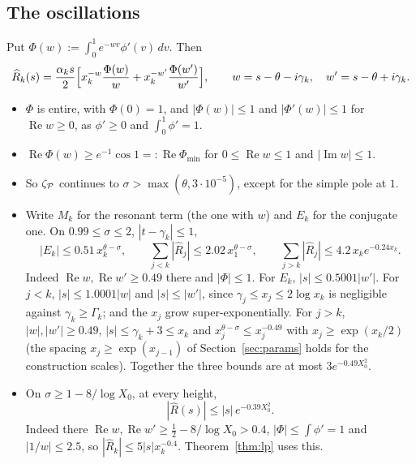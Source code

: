 \subsection{The oscillations}
Put $\Phi(w):=\int_0^1e^{-wv}\phi'(v)\,dv$. Then
\begin{equation}\label{eq:Rhat}
  \widehat R_k(s)=\frac{\alpha_ks}2\Bigl[x_k^{-w}\frac{\Phi(w)}w+x_k^{-w'}\frac{\Phi(w')}{w'}\Bigr],\qquad w=s-\theta-i\gamma_k,\quad
  w'=s-\theta+i\gamma_k.
\end{equation}
\begin{itemize}
\item $\Phi$ is entire, with $\Phi(0)=1$, and $|\Phi(w)|\le1$ and $|\Phi'(w)|\le1$ for $\operatorname{Re}w\ge0$, as $\phi'\ge0$ and
$\int_0^1\phi'=1$.
\item $\operatorname{Re}\Phi(w)\ge e^{-1}\cos1=:\operatorname{Re}\Phi_{\min}$ for $0\le\operatorname{Re}w\le1$ and $|\operatorname{Im}w|\le1$.
\item So $\zeta_{\mathcal{P}}$ continues to $\sigma>\max(\theta,3\cdot10^{-5})$, except for the simple pole at $1$.
\item Write $M_k$ for the resonant term (the one with $w$) and $E_k$ for the conjugate one. On $0.99\le\sigma\le2$, $|t-\gamma_k|\le1$,
\[
  |E_k|\le0.51\,x_k^{\theta-\sigma},\qquad\sum_{j<k}|\widehat R_j|\le2.02\,x_1^{\theta-\sigma},\qquad
  \sum_{j>k}|\widehat R_j|\le4.2\,x_ke^{-0.24x_k}.
\]
Indeed $\operatorname{Re}w,\operatorname{Re}w'\ge0.49$ there and $|\Phi|\le1$. For $E_k$, $|s|\le0.5001|w'|$. For $j<k$, $|s|\le1.0001|w|$
and $|s|\le|w'|$, since $\gamma_j\le x_j\le2\log x_k$ is negligible against $\gamma_k\ge\Gamma_k$; and the $x_j$ grow
super-exponentially. For $j>k$, $|w|,|w'|\ge0.49$, $|s|\le\gamma_k+3\le x_k$ and $x_j^{\theta-\sigma}\le x_j^{-0.49}$ with
$x_j\ge\exp(x_k/2)$ (the spacing $x_j\ge\exp(x_{j-1})$ of Section~\ref{sec:params} holds for the construction scales). Together
the three bounds are at most $3e^{-0.49X_0^2}$.
\item On $\sigma\ge1-8/\log X_0$, at every height,
\begin{equation}\label{eq:Rhatbound}
  |\widehat R(s)|\le|s|\,e^{-0.39X_0^2}.
\end{equation}
Indeed there $\operatorname{Re}w,\operatorname{Re}w'\ge\tfrac12-8/\log X_0>0.4$, $|\Phi|\le\int\phi'=1$ and $|1/w|\le2.5$, so
$|\widehat R_k|\le5|s|x_k^{-0.4}$. Theorem~\ref{thm:lp} uses this.
\end{itemize}

